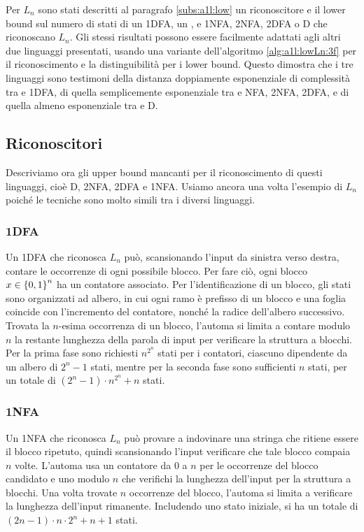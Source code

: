 Per $L_n$ sono stati descritti al paragrafo \ref{subs:a1l:low} un  riconoscitore e il lower bound sul numero di stati di un 1DFA, un , e 1NFA, 2NFA, 2DFA o D che riconoscano $L_n$. Gli stessi risultati possono essere facilmente adattati agli altri due linguaggi presentati, usando una variante dell'algoritmo \ref{alg:a1l:lowLn:3f} per il riconoscimento e la distinguibilità per i lower bound. Questo dimostra che i tre linguaggi sono testimoni della distanza doppiamente esponenziale di complessità tra  e 1DFA, di quella semplicemente esponenziale tra  e NFA, 2NFA, 2DFA, e di quella almeno esponenziale tra  e D.


\subsection{Riconoscitori}
Descriviamo ora gli upper bound mancanti per il riconoscimento di questi linguaggi, cioè D, 2NFA, 2DFA e 1NFA. Usiamo ancora una volta l'esempio di $L_n$ poiché le tecniche sono molto simili tra i diversi linguaggi.

\subsubsection{1DFA}
Un 1DFA che riconosca $L_n$ può, scansionando l'input da sinistra verso destra, contare le occorrenze di ogni possibile blocco. Per fare ciò, ogni blocco $x\in\left\{ 0,1 \right\}^n$ ha un contatore associato. Per l'identificazione di un blocco, gli stati sono organizzati ad albero, in cui ogni ramo è prefisso di un blocco e una foglia coincide con l'incremento del contatore, nonché la radice dell'albero successivo. Trovata la $n$-esima occorrenza di un blocco, l'automa si limita a contare modulo $n$ la restante lunghezza della parola di input per verificare la struttura a blocchi. Per la prima fase sono richiesti $n^{2^n}$ stati per i contatori, ciascuno dipendente da un albero di $2^n-1$ stati, mentre per la seconda fase sono sufficienti $n$ stati, per un totale di $(2^n-1)\cdot n^{2^n}+n$ stati.

\subsubsection{1NFA}
Un 1NFA che riconosca $L_n$ può provare a indovinare una stringa che ritiene essere il blocco ripetuto, quindi scansionando l'input verificare che tale blocco compaia $n$ volte. L'automa usa un contatore da $0$ a $n$ per le occorrenze del blocco candidato e uno modulo $n$ che verifichi la lunghezza dell'input per la struttura a blocchi. Una volta trovate $n$ occorrenze del blocco, l'automa si limita a verificare la lunghezza dell'input rimanente. Includendo uno stato iniziale, si ha un totale di $(2n-1)\cdot n\cdot 2^n+n+1$ stati.

